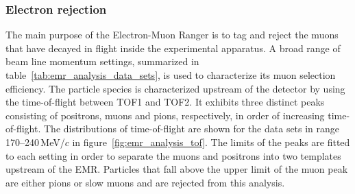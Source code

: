 \subsubsection{Electron rejection}
The main purpose of the Electron-Muon Ranger is to tag and reject the muons that have decayed in flight inside the experimental apparatus. A broad range of beam line momentum settings, summarized in table~\ref{tab:emr_analysis_data_sets}, is used to characterize its muon selection efficiency. The particle species is characterized upstream of the detector by using the time-of-flight between TOF1 and TOF2. It exhibits three distinct peaks consisting of positrons, muons and pions, respectively, in order of increasing time-of-flight. The distributions of time-of-flight are shown for the data sets in range 170--240\,MeV/$c$ in figure~\ref{fig:emr_analysis_tof}. The limits of the peaks are fitted to each setting in order to separate the muons and positrons into two templates upstream of the EMR. Particles that fall above the upper limit of the muon peak are either pions or slow muons and are rejected from this analysis.

